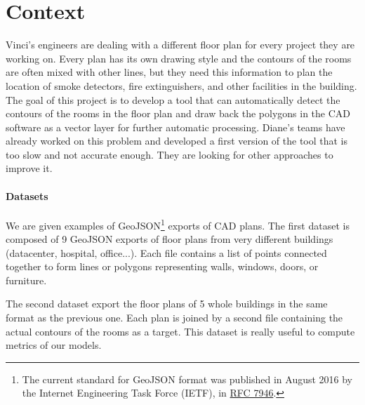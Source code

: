 \documentclass[11pt]{article}
\begin{document}

\section{Context}
Vinci's engineers are dealing with a different floor plan for every project they are working on.
Every plan has its own drawing style and the contours of the rooms are often mixed with other
lines, but they need this information to plan the location of smoke detectors, fire extinguishers,
and other facilities in the building. The goal of this project is to develop a tool that can
automatically detect the contours of the rooms in the floor plan and draw back the polygons in the CAD software as 
a vector layer for further automatic processing. 
Diane's teams have already worked on this problem and developed a first version of the tool
that is too slow and not accurate enough. They are looking for other approaches
to improve it.
\paragraph{Datasets}
We are given examples of GeoJSON\footnote{The current standard for GeoJSON format was 
published in August 2016 by the Internet Engineering Task Force (IETF), 
in \href{https://datatracker.ietf.org/doc/html/rfc7946}{RFC 7946}.} exports of CAD plans. The first dataset is 
composed of 9 GeoJSON exports of floor plans from very different buildings (datacenter, 
hospital, office...). Each file contains a list of points 
connected together to form lines or polygons representing walls, windows, doors, 
or furniture.

The second dataset export the floor plans of 5 whole buildings in the same format
as the previous one. Each plan is joined by a second file 
containing the actual contours of the rooms as a target. This dataset is really useful 
to compute metrics of our models.

\end{document}
